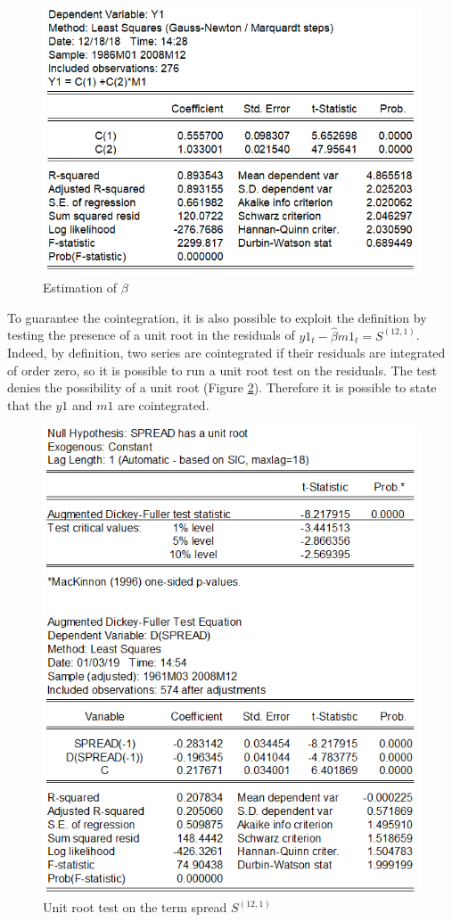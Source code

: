 \documentclass[12pt]{article}
\begin{document}
\begin{figure}[H]
\includegraphics[scale=1]{beta_estimation.PNG} 
\centering
\caption{Estimation of $\beta$ \label{fig:betaestim}}
\end{figure}
\noindent To guarantee the cointegration, it is also possible to exploit the definition by testing the presence of a unit root in the residuals of $y1_t- \hat{\beta}m1_t = S^{(12,1)}$. Indeed, by definition, two series are cointegrated if their residuals are integrated of order zero, so it is possible to run a unit root test on the residuals. The test denies the possibility of a unit root (Figure  \ref{fig:unitroottest}). Therefore it is possible to state that the $y1$ and $m1$ are cointegrated.
\begin{figure} [H]
\centering
\includegraphics[scale=1]{unit_root_spread_test.PNG} 
\caption{Unit root test on the term spread $S^{(12,1)}$ \label{fig:unitroottest}}
\end{figure}
\end{document}
